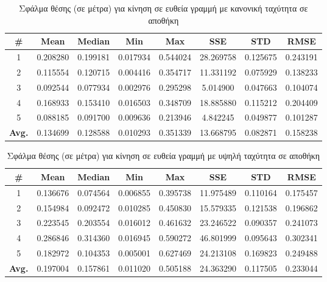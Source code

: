 \begin{table}[H]
    \begin{center}
        \centering
        \caption{Σφάλμα θέσης (σε μέτρα) για κίνηση σε ευθεία γραμμή με κανονική ταχύτητα σε αποθήκη}
        \label{tab:position_error_line_normal_warehouse}
        \begin{tabular}{| c | c | c | c | c | c | c | c | }
        \hline
        \rowcolor{Gray}
        \# & Mean & Median & Min & Max & SSE & STD & RMSE \\
        \hline
        1 & 0.208280 & 0.199181 & 0.017934 & 0.544024 & 28.269758 & 0.125675 & 0.243191 \\ 
        2 & 0.115554 & 0.120715 & 0.004416 & 0.354717 & 11.331192 & 0.075929 & 0.138233 \\
        3 & 0.092544 & 0.077934 & 0.002976 & 0.295298 & 5.014900 & 0.047663 & 0.104074 \\
        4 & 0.168933 & 0.153410 & 0.016503 & 0.348709 & 18.885880 & 0.115212 & 0.204409 \\
        5 & 0.088185 & 0.091700 & 0.009636 & 0.213946 & 4.842245 & 0.049877 & 0.101287 \\
        \hline
        \textbf{Avg.} & 0.134699 & 0.128588 & 0.010293 & 0.351339 & 13.668795 & 0.082871 & 0.158238 \\
        \hline
        \end{tabular}
    \end{center}
\end{table}

\begin{table}[H]
    \begin{center}
        \centering
        \caption{Σφάλμα θέσης (σε μέτρα) για κίνηση σε ευθεία γραμμή με υψηλή ταχύτητα σε αποθήκη}
            \label{tab:position_error_line_fast_warehouse}
        \begin{tabular}{| c | c | c | c | c | c | c | c | }
        \hline
        \rowcolor{Gray}
        \# & Mean & Median & Min & Max & SSE & STD & RMSE \\
        \hline
        1 & 0.136676 & 0.074564 & 0.006855 & 0.395738 & 11.975489 & 0.110164 & 0.175457 \\ 
        2 & 0.154984 & 0.092472 & 0.010285 & 0.450830 & 15.579335 & 0.121538 & 0.196862 \\
        3 & 0.223545 & 0.203554 & 0.016012 & 0.461632 & 23.246522 & 0.090357 & 0.241073 \\
        4 & 0.286846 & 0.314360 & 0.016945 & 0.590272 & 46.801999 & 0.095643 & 0.302341 \\
        5 & 0.182972 & 0.104353 & 0.005001 & 0.627469 & 24.213108 & 0.169823 & 0.249488 \\
        \hline
        \textbf{Avg.} & 0.197004 & 0.157861 & 0.011020 & 0.505188 & 24.363290 & 0.117505 & 0.233044 \\
        \hline
        \end{tabular}
    \end{center}
\end{table}

